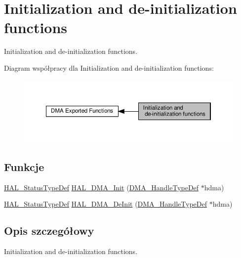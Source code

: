 \hypertarget{group___d_m_a___exported___functions___group1}{}\section{Initialization and de-\/initialization functions}
\label{group___d_m_a___exported___functions___group1}


Initialization and de-\/initialization functions.  


Diagram współpracy dla Initialization and de-\/initialization functions\+:\nopagebreak
\begin{figure}[H]
\begin{center}
\leavevmode
\includegraphics[width=350pt]{group___d_m_a___exported___functions___group1}
\end{center}
\end{figure}
\subsection*{Funkcje}
\begin{DoxyCompactItemize}
\item 
\hyperlink{stm32f4xx__hal__def_8h_a63c0679d1cb8b8c684fbb0632743478f}{H\+A\+L\+\_\+\+Status\+Type\+Def} \hyperlink{group___d_m_a___exported___functions___group1_ga0fbcb690074233a03f2fa366dc22ff01}{H\+A\+L\+\_\+\+D\+M\+A\+\_\+\+Init} (\hyperlink{group___d_m_a___exported___types_ga41b754a906b86bce54dc79938970138b}{D\+M\+A\+\_\+\+Handle\+Type\+Def} $\ast$hdma)
\item 
\hyperlink{stm32f4xx__hal__def_8h_a63c0679d1cb8b8c684fbb0632743478f}{H\+A\+L\+\_\+\+Status\+Type\+Def} \hyperlink{group___d_m_a___exported___functions___group1_ga7bb8587d642da11252a97f5c41c389ef}{H\+A\+L\+\_\+\+D\+M\+A\+\_\+\+De\+Init} (\hyperlink{group___d_m_a___exported___types_ga41b754a906b86bce54dc79938970138b}{D\+M\+A\+\_\+\+Handle\+Type\+Def} $\ast$hdma)
\end{DoxyCompactItemize}


\subsection{Opis szczegółowy}
Initialization and de-\/initialization functions. 




